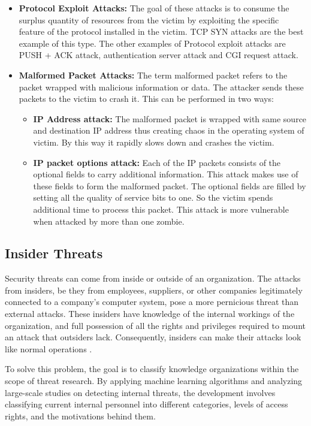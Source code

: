 \documentclass{ijitcs}
\begin{document}
\begin{itemize}
    \item \textbf{Protocol Exploit Attacks:} The goal of these attacks is to consume the surplus quantity of resources from the victim by exploiting the specific feature of the protocol installed in the victim. TCP SYN attacks are the best example of this type. The other examples of Protocol exploit attacks are PUSH + ACK attack, authentication server attack and CGI request attack.
    \item \textbf{Malformed Packet Attacks:} The term malformed packet refers to the packet wrapped with malicious information or data. The attacker sends these packets to the victim to crash it. This can be performed in two ways: 
    \begin{itemize}
        \item[] \textbf{IP Address attack:} The malformed packet is wrapped with same source and destination IP address thus creating chaos in the operating system of victim. By this way it rapidly slows down and crashes the victim.
        \item[] \textbf{IP packet options attack:} Each of the IP packets consists of the optional fields to carry additional information. This attack makes use of these fields to form the malformed packet. The optional fields are filled by setting all the quality of service bits to one. So the victim spends additional time to process this packet. This attack is more vulnerable when attacked by more than one zombie.
    \end{itemize}
\end{itemize}

\subsection{Insider Threats}

 Security threats can come from inside or outside of an organization. The attacks from insiders, be they from employees, suppliers, or other companies legitimately connected to a company’s computer system, pose a more pernicious threat than external attacks. These insiders have knowledge of the internal workings of the organization, and full possession of all the rights and privileges required to mount an attack that outsiders lack. Consequently, insiders can make their attacks look like normal operations \cite{gheyas2016detection}.

To solve this problem, the goal is to classify knowledge organizations within the scope of threat research. By applying machine learning algorithms and analyzing large-scale studies on detecting internal threats, the development involves classifying current internal personnel into different categories, levels of access rights, and the motivations behind them.
\end{document}
